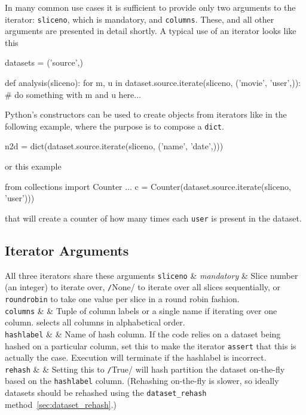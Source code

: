 In many common use cases it is sufficient to provide only two
arguments to the iterator: \texttt{sliceno}, which is mandatory,
and \texttt{columns}.  These, and all other arguments are presented in
detail shortly. A typical use of an iterator looks like this
\begin{python}
datasets = ('source',)

def analysis(sliceno):
    for m, u in dataset.source.iterate(sliceno, ('movie', 'user',)):
        # do something with m and u here...
\end{python}
Python's constructors can be used to create objects from iterators
like in the following example, where the purpose is to compose
a \texttt{dict}.
\begin{python}
n2d = dict(dataset.source.iterate(sliceno, ('name', 'date',)))
\end{python}
or this example
\begin{python}
from collections import Counter
...
    c = Counter(dataset.source.iterate(sliceno, 'user')))
\end{python}
that will create a counter of how many times each \texttt{user} is
present in the dataset.



\subsection{Iterator Arguments}

All three iterators share these arguments
\starttable
  \RP \texttt{sliceno} & \textsl{mandatory} & Slice number (an
  integer) to iterate over, \texttt/None/ to iterate over
  all slices sequentially, or \texttt{roundrobin} to take one value
  per slice in a round robin fashion. \\[1ex]

  \RP \texttt{columns} & \pyNone & Tuple of column labels or a single
  name if iterating over one column.  \pyNone selects all columns in
  alphabetical order.\\[1ex]

  \RP \texttt{hashlabel} & \pyNone & Name of hash column.  If the code
  relies on a dataset being hashed on a particular column, set this to
  make the iterator \texttt{assert} that this is actually the case.
  Execution will terminate if the hashlabel is incorrect.\\[1ex]

  \RP \texttt{rehash} & \pyFalse & Setting this
  to \texttt/True/ will hash partition the dataset
  on-the-fly based on the \texttt{hashlabel} column.  (Rehashing
  on-the-fly is slower, so ideally datasets should be rehashed using
  the \texttt{dataset\_rehash}
  method~\ref{sec:dataset_rehash}.)\\[1ex]
  
